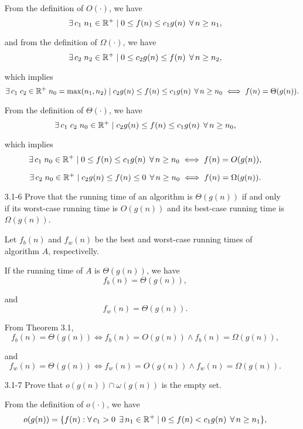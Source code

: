 \begin{enumerate}
\begin{framed}
From the definition of $O(\cdot)$, we have
\[
\operatorname{\exists} c_1\;n_1\in\mathbb{R}^+ \mid 0 \le f(n) \le c_1g(n)\;\operatorname{\forall} n \ge n_1,
\]

and from the definition of $\Omega(\cdot)$, we have
\[
\operatorname{\exists} c_2\;n_2\in\mathbb{R}^+ \mid 0 \le c_2g(n) \le f(n)\;\operatorname{\forall} n \ge n_2,
\]

which implies
\[
\operatorname{\exists} c_1\;c_2\in\mathbb{R}^+\;n_0 = \max(n_1, n_2) \mid
c_2g(n) \leq f(n) \leq c_1g(n)\;\operatorname{\forall} n \ge n_0 \iff f(n) = \Theta(g(n)).
\]

From the definition of $\Theta(\cdot)$, we have
\[
\operatorname{\exists} c_1\;c_2\;n_0\in\mathbb{R}^+ \mid c_2g(n) \leq f(n) \leq c_1g(n)\;
\operatorname{\forall} n \ge n_0,
\]

which implies
\[
\operatorname{\exists} c_1\;n_0\in\mathbb{R}^+ \mid 0 \leq f(n) \leq c_1 g(n)\;
\operatorname{\forall} n \ge n_0 \iff f(n) = O(g(n)),
\]

\[
\operatorname{\exists} c_2\;n_0\in\mathbb{R}^+ \mid c_2 g(n) \leq f(n) \leq 0\;
\operatorname{\forall} n \ge n_0 \iff f(n) = \Omega(g(n)).
\]

\end{framed}

\newpage

\item[3.1{-}6]{Prove that the running time of an algorithm is $\Theta(g(n))$ if
  and only if its worst-case running time is $O(g(n))$ and its best-case running
  time is $\Omega(g(n))$.}

\begin{framed}
Let $f_b(n)$ and $f_w(n)$ be the best and worst-case running times of algorithm
$A$, respectivelly.

If the running time of $A$ is $\Theta(g(n))$, we have
\[
f_b(n) = \Theta(g(n)),
\]

and
\[
f_w(n) = \Theta(g(n)).
\]

From Theorem 3.1,
\[
f_b(n) = \Theta(g(n)) \iff f_b(n) = O(g(n)) \wedge f_b(n) = \Omega(g(n)),
\]

and
\[
f_w(n) = \Theta(g(n)) \iff f_w(n) = O(g(n)) \wedge f_w(n) = \Omega(g(n)).
\]

\end{framed}

\item[3.1{-}7]{Prove that $o(g(n)) \cap \omega(g(n))$ is the empty set.}

\begin{framed}
From the definition of $o(\cdot)$, we have
\[
o(g(n)) = \{ f(n) : \operatorname{\forall} c_1 > 0\;\operatorname{\exists} n_1 \in \mathbb{R}^+ \mid
             0 \le f(n) < c_1g(n)\;\operatorname{\forall} n \ge n_1 \},
\]


\end{framed}
\end{enumerate}
